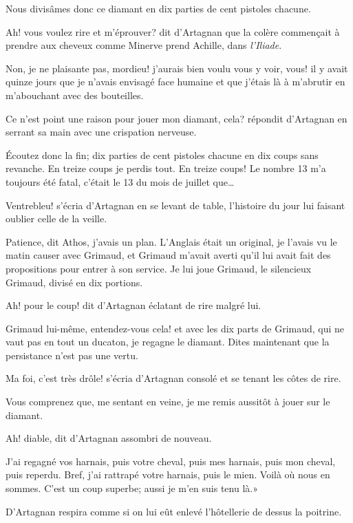 \speak  Nous divisâmes donc ce diamant en dix parties de cent pistoles chacune. 

\speak  Ah! vous voulez rire et m'éprouver? dit d'Artagnan que la colère commençait à prendre aux cheveux comme Minerve prend Achille, dans \textit{l'Iliade}. 

\speak  Non, je ne plaisante pas, mordieu! j'aurais bien voulu vous y voir, vous! il y avait quinze jours que je n'avais envisagé face humaine et que j'étais là à m'abrutir en m'abouchant avec des bouteilles. 

\speak  Ce n'est point une raison pour jouer mon diamant, cela? répondit d'Artagnan en serrant sa main avec une crispation nerveuse. 

\speak  Écoutez donc la fin; dix parties de cent pistoles chacune en dix coups sans revanche. En treize coups je perdis tout. En treize coups! Le nombre 13 m'a toujours été fatal, c'était le 13 du mois de juillet que\dots 

\speak  Ventrebleu! s'écria d'Artagnan en se levant de table, l'histoire du jour lui faisant oublier celle de la veille. 

\speak  Patience, dit Athos, j'avais un plan. L'Anglais était un original, je l'avais vu le matin causer avec Grimaud, et Grimaud m'avait averti qu'il lui avait fait des propositions pour entrer à son service. Je lui joue Grimaud, le silencieux Grimaud, divisé en dix portions. 

\speak  Ah! pour le coup! dit d'Artagnan éclatant de rire malgré lui. 

\speak  Grimaud lui-même, entendez-vous cela! et avec les dix parts de Grimaud, qui ne vaut pas en tout un ducaton, je regagne le diamant. Dites maintenant que la persistance n'est pas une vertu. 

\speak  Ma foi, c'est très drôle! s'écria d'Artagnan consolé et se tenant les côtes de rire. 

\speak  Vous comprenez que, me sentant en veine, je me remis aussitôt à jouer sur le diamant. 

\speak  Ah! diable, dit d'Artagnan assombri de nouveau. 

\speak  J'ai regagné vos harnais, puis votre cheval, puis mes harnais, puis mon cheval, puis reperdu. Bref, j'ai rattrapé votre harnais, puis le mien. Voilà où nous en sommes. C'est un coup superbe; aussi je m'en suis tenu là.» 

D'Artagnan respira comme si on lui eût enlevé l'hôtellerie de dessus la poitrine. 

